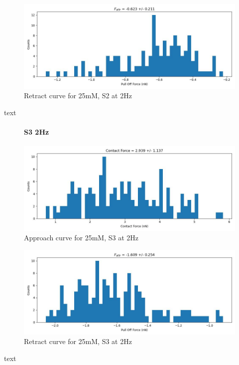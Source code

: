 \begin{figure}[h!]
\centering
\includegraphics[width=\textwidth]{chapter7/Tip speed/25mM/S2 2Hz/retract_f_a_hist.jpg}
\caption{Retract curve for 25mM, S2 at 2Hz}
\end{figure}
text
\newpage


\begin{figure}[h!]
\paragraph{S3 2Hz}
\centering
\includegraphics[width=\textwidth]{chapter7/Tip speed/25mM/S3 2Hz/approach_f_c_hist.jpg}
\caption{Approach curve for 25mM, S3 at 2Hz}
\end{figure}

\begin{figure}[h!]
\centering
\includegraphics[width=\textwidth]{chapter7/Tip speed/25mM/S3 2Hz/retract_f_a_hist.jpg}
\caption{Retract curve for 25mM, S3 at 2Hz}
\end{figure}
text
\newpage

